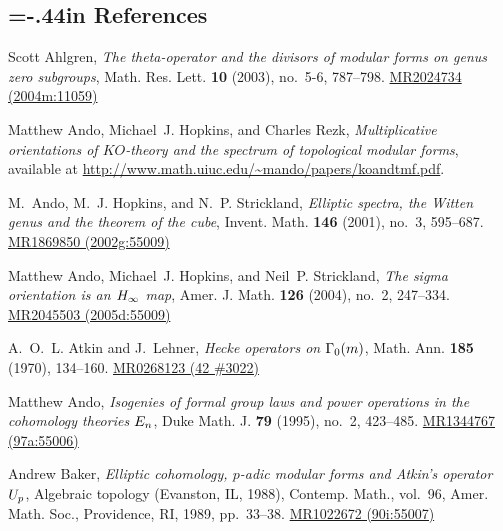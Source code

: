 \documentclass{gtpart}
\theoremstyle{definition}
\theoremstyle{remark}
\renewcommand{\=}{\approx}
\renewcommand{\-}{\sim}
\numberwithin{equation}{section}
\numberwithin{thm}{section}
\begin{document}
% 
% 

\renewcommand\refname{}
\newcommand{\MRn}[2]{\href{http://www.ams.org/mathscinet-getitem?mr=#1}{MR#1 #2}}
\newcommand{\AX}[1]{\href{http://arxiv.org/abs/#1}{arXiv:#1}}
\begin{thebibliography}

\section*{\leftskip=-.44in References \vspace{.13in}}

Scott Ahlgren, \emph{The theta-operator and the divisors of modular forms on
  genus zero subgroups}, Math. Res. Lett. \textbf{10} (2003), no.~5-6,
  787--798. \MRn{2024734}{(2004m:11059)}

Matthew Ando, Michael~J. Hopkins, and Charles Rezk, \emph{Multiplicative
  orientations of {$KO$}-theory and the spectrum of topological modular forms}, 
  available at \href{http://www.math.uiuc.edu/~mando/papers/koandtmf.pdf}{http://www.math.uiuc.edu/\textasciitilde mando/papers/koandtmf.pdf}.

M.~Ando, M.~J. Hopkins, and N.~P. Strickland, \emph{Elliptic spectra, the
  {W}itten genus and the theorem of the cube}, Invent. Math. \textbf{146}
  (2001), no.~3, 595--687. \MRn{1869850}{(2002g:55009)}

Matthew Ando, Michael~J. Hopkins, and Neil~P. Strickland, \emph{The sigma
  orientation is an {$H\sb \infty$} map}, Amer. J. Math. \textbf{126} (2004),
  no.~2, 247--334. \MRn{2045503}{(2005d:55009)}

A.~O.~L. Atkin and J.~Lehner, \emph{Hecke operators on {$\Gamma \sb{0}(m)$}},
  Math. Ann. \textbf{185} (1970), 134--160. \MRn{0268123}{(42 \#3022)}

Matthew Ando, \emph{Isogenies of formal group laws and power operations in the
  cohomology theories {$E\sb n$}}, Duke Math. J. \textbf{79} (1995), no.~2,
  423--485. \MRn{1344767}{(97a:55006)}

Andrew Baker, \emph{Elliptic cohomology, {$p$}-adic modular forms and {A}tkin's
  operator {$U\sb p$}}, Algebraic topology ({E}vanston, {IL}, 1988), Contemp.
  Math., vol.~96, Amer. Math. Soc., Providence, RI, 1989, pp.~33--38.
  \MRn{1022672}{(90i:55007)}


\end{thebibliography}
\end{document}
